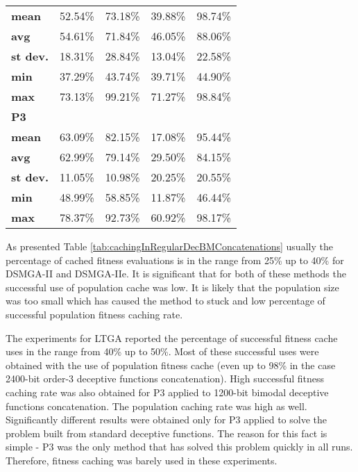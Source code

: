 \begin{table}[]
\begin{tabular}{lllll}
		\textbf{mean}    & 52.54\%       & 73.18\%      & 39.88\%       & 98.74\%      \\
		\textbf{avg}     & 54.61\%       & 71.84\%      & 46.05\%       & 88.06\%      \\
		\textbf{st dev.} & 18.31\%       & 28.84\%      & 13.04\%       & 22.58\%      \\
		\textbf{min}     & 37.29\%       & 43.74\%      & 39.71\%       & 44.90\%      \\
		\textbf{max}     & 73.13\%       & 99.21\%      & 71.27\%       & 98.84\%      \\
						\midrule
		\textbf{P3} &               &              &               &              \\
		\textbf{mean}    & 63.09\%       & 82.15\%      & 17.08\%       & 95.44\%      \\
		\textbf{avg}     & 62.99\%       & 79.14\%      & 29.50\%       & 84.15\%      \\
		\textbf{st dev.} & 11.05\%       & 10.98\%      & 20.25\%       & 20.55\%      \\
		\textbf{min}     & 48.99\%       & 58.85\%      & 11.87\%       & 46.44\%      \\
		\textbf{max}     & 78.37\%       & 92.73\%      & 60.92\%       & 98.17\%  \\
			\bottomrule
	\end{tabular}
\end{table}

As presented Table \ref{tab:cachingInRegularDecBMConcatenations} usually the percentage of cached fitness evaluations is in the range from 25\% up to 40\% for DSMGA-II and DSMGA-IIe. It is significant that for both of these methods the successful use of population cache was low. It is likely that the population size was too small which has caused the method to stuck and low percentage of successful population fitness caching rate.\par

The experiments for LTGA reported the percentage of successful fitness cache uses in the range from 40\% up to 50\%. Most of these successful uses were obtained with the use of population fitness cache (even up to 98\% in the case 2400-bit order-3 deceptive functions concatenation). High successful fitness caching rate was also obtained for P3 applied to 1200-bit bimodal deceptive functions concatenation. The population caching rate was high as well. Significantly different results were obtained only for P3 applied to solve the problem built from standard deceptive functions. The reason for this fact is simple - P3 was the only method that has solved this problem quickly in all runs. Therefore, fitness caching was barely used in these experiments.\par




